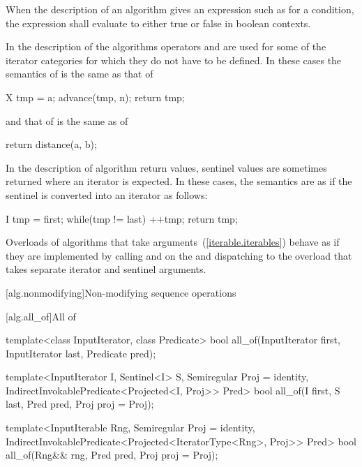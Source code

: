 \begin{removedblock}
\pnum
When the description of an algorithm gives an expression such as
for a condition, the expression shall evaluate to
either true or false in boolean contexts.
\end{removedblock}

\pnum
In the description of the algorithms operators
\tcode{+}
and
\tcode{-}
are used for some of the iterator categories for which
they do not have to be defined.
In these cases the semantics of
is the same as that of

\begin{codeblock}
X tmp = a;
advance(tmp, n);
return tmp;
\end{codeblock}

and that of
is the same as of

\begin{codeblock}
return distance(a, b);
\end{codeblock}

\begin{addedblock}
\pnum
In the description of algorithm return values, sentinel values are sometimes
returned where an iterator is expected. In these cases, the semantics are as
if the sentinel is converted into an iterator as follows:

\begin{codeblock}
I tmp = first;
while(tmp != last)
  ++tmp;
return tmp;
\end{codeblock}

\pnum
Overloads of algorithms that take  arguments~(\ref{iterable.iterables})
behave as if they are implemented by calling  and  on
the  and dispatching to the overload that takes separate
iterator and sentinel arguments.
\end{addedblock}

[alg.nonmodifying]{Non-modifying sequence operations}

[alg.all_of]{All of}

%
\begin{removedblock}
\begin{itemdecl}
template<class InputIterator, class Predicate>
  bool all_of(InputIterator first, InputIterator last, Predicate pred);
\end{itemdecl}
\end{removedblock}
\begin{addedblock}
\begin{itemdecl}
template<InputIterator I, Sentinel<I> S, Semiregular Proj = identity,
    IndirectInvokablePredicate<Projected<I, Proj>> Pred>
  bool all_of(I first, S last, Pred pred, Proj proj = Proj{});

template<InputIterable Rng, Semiregular Proj = identity,
    IndirectInvokablePredicate<Projected<IteratorType<Rng>, Proj>> Pred>
  bool all_of(Rng&& rng, Pred pred, Proj proj = Proj{});
\end{itemdecl}
\end{addedblock}

